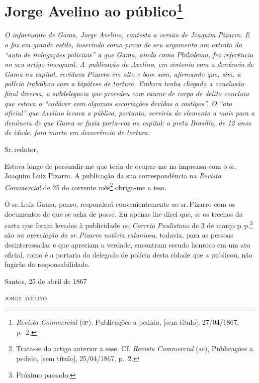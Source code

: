 \chapter{Jorge Avelino ao público\footnote{
\emph{Revista Commercial} (\textsc{sp}), Publicações a pedido, {[}sem título{]}, 
27/04/1867, p.~2.}}

\begin{didascalia}\itshape
O informante de Gama, Jorge Avelino, contesta a versão de Joaquim
Pizarro. E o faz em grande estilo, inserindo como prova de seu argumento
um extrato do ``auto de indagações policiais'' a que Gama, ainda como
Philodemo, fez referência no seu artigo inaugural. A~publicação de
Avelino, em sintonia com a denúncia de Gama na capital, revidava Pizarro
em alto e bom som, afirmando que, sim, a polícia trabalhou com a
hipótese de tortura. Embora tenha chegado a conclusão final diversa, a
subdelegacia que procedeu com exame de corpo de delito concluiu que
estava o ``cadáver com algumas escoriações devidas a castigos''. O ``ato
oficial'' que Avelino levava a público, portanto, serviria de elemento a
mais para a denúncia de que Gama se fazia porta-voz na capital: a preta
Brasília, de 12 anos de idade, fora morta em decorrência de tortura.
\end{didascalia}

Sr.\,redator,

Estava longe de persuadir-me que teria de ocupar-me na imprensa com o
sr.\,Joaquim Luiz Pizarro. A publicação da sua correspondência na
\emph{Revista Commercial} de 25 do corrente mês\footnote{ Trata-se
  do artigo anterior a esse. Cf. \emph{Revista Commercial} (\textsc{sp}),
  Publicações a pedido, {[}sem título{]}, 25/04/1867, p.~2.} obriga-me a
isso.

O sr.\,Luiz Gama, penso, responderá convenientemente ao sr.\,Pizarro com
os documentos de que se acha de posse. Eu apenas lhe direi que, se os
trechos da carta que foram levados à publicidade no \emph{Correio
Paulistano} de 3 de março p.\,p.\footnote{ Próximo
  passado.} são \emph{na apreciação do sr.\,Pizarro notícia caluniosa},
todavia, para as pessoas desinteressadas e que apreciam a verdade,
encontram escudo honroso em um ato oficial, como é a portaria do
delegado de polícia desta cidade que a publicou, não fugirão da
responsabilidade.

\begin{flushright}
Santos, 25 de abril de 1867

\textsc{jorge avelino}
\end{flushright}

